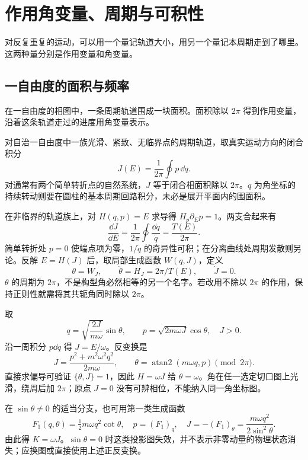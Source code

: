 \section{作用角变量、周期与可积性}
对反复重复的运动，可以用一个量记轨道大小，用另一个量记本周期走到了哪里。这两种量分别是作用变量和角变量。

\subsection{一自由度的面积与频率}
在一自由度的相图中，一条周期轨道围成一块面积。面积除以 $2\pi$ 得到作用变量，沿着这条轨道走过的进度用角变量表示。

对自治一自由度中一族光滑、紧致、无临界点的周期轨道，取真实运动方向的闭合积分
\begin{equation}
J(E)=\frac1{2\pi}\oint p\,\dd q.
\label{eq:action-variable}
\end{equation}
对通常有两个简单转折点的自然系统，$J$ 等于闭合相面积除以 $2\pi$。$q$ 为角坐标的持续转动则要在圆柱的基本周期回路积分，未必是展开平面内的围面积。

在非临界的轨道族上，对 $H(q,p)=E$ 求导得 $H_p\partial_Ep=1$。两支合起来有
\[
\frac{\dd J}{\dd E}=\frac1{2\pi}\oint\frac{\dd q}{\dot q}
=\frac{T(E)}{2\pi}.
\]
简单转折处 $p=0$ 使端点项为零，$1/\dot q$ 的奇异性可积；在分离曲线处周期发散则另论。反解 $E=H(J)$ 后，取局部生成函数 $W(q,J)$，定义
\begin{equation}
\theta=W_J,\qquad\dot\theta=H_J=2\pi/T(E),\qquad\dot J=0.
\label{eq:angle-variable}
\end{equation}
$\theta$ 的周期为 $2\pi$，不是构型角必然相等的另一个名字。若改用不除以 $2\pi$ 的作用，保持正则性就需将其共轭角同时除以 $2\pi$。

\begin{example}[谐振子的全周期相位与局部生成函数]
取
\[
q=\sqrt{\frac{2J}{m\omega}}\sin\theta,\qquad
p=\sqrt{2m\omega J}\cos\theta,\quad J>0.
\]
沿一周积分 $p\dd q$ 得 $J=E/\omega$。反变换是
\[
J=\frac{p^2+m^2\omega^2q^2}{2m\omega},\qquad
\theta=\operatorname{atan2}(m\omega q,p)\pmod{2\pi}.
\]
直接求偏导可验证 $\{\theta,J\}=1$，因此 $H=\omega J$ 给 $\dot\theta=\omega$。角在任一选定切口图上光滑，绕周后加 $2\pi$；原点 $J=0$ 没有可辨相位，不能纳入同一角坐标图。

在 $\sin\theta\ne0$ 的适当分支，也可用第一类生成函数
\[
F_1(q,\theta)=\tfrac12m\omega q^2\cot\theta,
\quad p=(F_1)_q,\quad J=-(F_1)_\theta
=\frac{m\omega q^2}{2\sin^2\theta}.
\]
由此得 $K=\omega J$。$\sin\theta=0$ 时这类投影图失效，并不表示非零动量的物理状态消失；应换图或直接使用上述正反变换。
\end{example}

